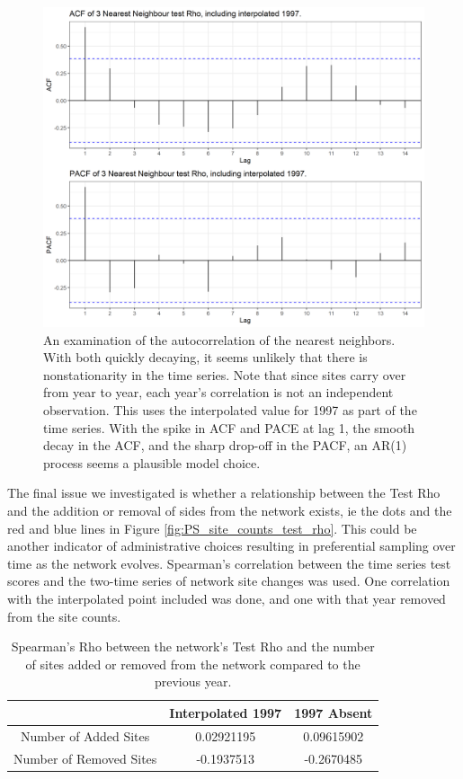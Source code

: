 \documentclass{article}
\begin{document}
\begin{figure}
    \centering
    \includegraphics[width = \textwidth]{Figures/PreferentialSampling/test_rho_acf_pacf_interp1997.png}
    \caption{An examination of the autocorrelation of the nearest neighbors.  With both quickly decaying, it seems unlikely that there is nonstationarity in the time series.   Note that since sites carry over from year to year, each year's correlation is not an independent observation.  This uses the interpolated value for 1997 as part of the time series.  With the spike in ACF and PACE at lag 1, the smooth decay in the ACF, and the sharp drop-off in the PACF, an AR(1) process seems a plausible model choice.}
    \label{fig:test_rho_acf_pacf}
\end{figure}

The final issue we investigated is whether a  relationship between the Test Rho and the addition or removal of sides from the network exists, ie the dots and the red and blue lines in Figure \ref{fig:PS_site_counts_test_rho}.  This could be another indicator of administrative choices resulting in preferential sampling over time as the network evolves.  Spearman's correlation between the time series test scores and the two-time series of network site changes was used.   One correlation with the interpolated point included was done, and one with that year removed from the site counts.

\begin{table}[ht]
    \centering
    \begin{tabular}{c|c|c}
         &  Interpolated 1997 & 1997 Absent\\
        \hline
        Number of Added Sites & 0.02921195 & 0.09615902 \\
        Number of Removed Sites & -0.1937513 & -0.2670485
    \end{tabular}
    \caption{Spearman's Rho between the network's Test Rho and the number of sites added or removed from the network compared to the previous year.}
    \label{tab:testRho_siteChange}
\end{table}
\end{document}
